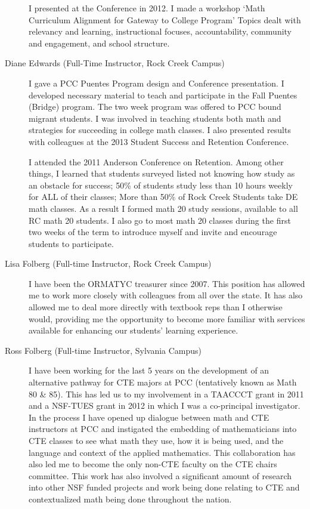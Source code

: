 \begin{description}
	I presented at the Conference in 2012. I made a workshop `Math Curriculum
	Alignment for Gateway to College Program' Topics dealt with relevancy and
	learning, instructional focuses, accountability, community and engagement, and
	school structure.

	\item[Diane Edwards (Full-Time Instructor, Rock Creek Campus)]
	I gave a PCC Puentes Program design and Conference presentation.  I developed
	necessary material to teach and participate in the Fall Puentes (Bridge)
	program. The two week program was offered to PCC bound migrant students. I was
	involved in teaching students both math and strategies for succeeding in
	college math classes. I also presented results with colleagues at the 2013
	Student Success and Retention Conference.

	I attended the 2011 Anderson Conference on Retention. Among other things, I
	learned that students surveyed listed not knowing how study as an
	obstacle for success; 50\% of students study less than 10 hours weekly for ALL
	of their classes; More than 50\% of Rock Creek Students take DE math classes. As
	a result I formed math 20 study sessions, available to all RC math 20 students.
	I also go to most math 20 classes during the first two weeks of the term to
	introduce myself and invite and encourage students to participate.

	\item[Lisa Folberg (Full-time Instructor, Rock Creek Campus)]
	I have been the ORMATYC treasurer since 2007.  This position has allowed me to
	work more closely with colleagues from all over the state.  It has also allowed
	me to deal more directly with textbook reps than I otherwise would, providing
	me the opportunity to become more familiar with services available for
	enhancing our students' learning experience.

	\item[Ross Folberg (Full-time Instructor, Sylvania Campus)]
	I have been working for the last 5 years on the development of an alternative
	pathway for CTE majors at PCC (tentatively known as Math 80 \& 85).  This has
	led us to my involvement in a TAACCCT grant in 2011 and a NSF-TUES grant in
	2012 in which I was a co-principal investigator.  In the process I have opened
	up dialogue between math and CTE instructors at PCC and instigated the
	embedding of mathematicians into CTE classes to see what math they use, how it
	is being used, and the language and context of the applied mathematics.  This
	collaboration has also led me to become the only non-CTE faculty on the CTE
	chairs committee.  This work has also involved a significant amount of research
	into other NSF funded projects and work being done relating to CTE and
	contextualized math being done throughout the nation.


\end{description}
